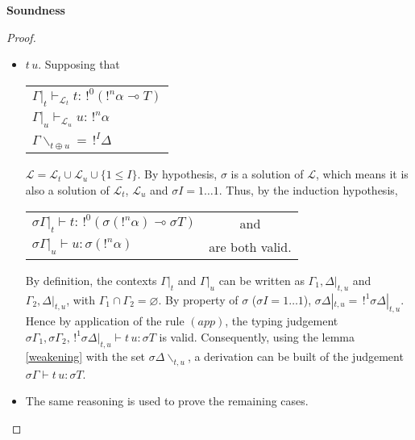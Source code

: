 \begin{prop}{\bf Soundness}
\begin{proof}
\begin{itemize}
		\item $t \, u$. Supposing that
			\begin{center}
			\begin{tabular}{l}
				$\Gamma |_t \vdash_{\mathcal{L}_t} t : \,!^0(!^n\alpha \multimap T)$ \\
				$\Gamma |_u \vdash_{\mathcal{L}_u} u : \,!^n\alpha$ \\
				$\Gamma \backslash_{t \oplus u} = \,!^I \Delta$
			\end{tabular}
			\end{center}
			$\mathcal{L} = \mathcal{L}_t \cup \mathcal{L}_u \cup \{ 1 \le I \}$. By hypothesis, $\sigma$ is a solution of $\mathcal{L}$,
			which means it is also a solution of $\mathcal{L}_t$, $\mathcal{L}_u$ and $\sigma I = 1 \dots 1$.
			Thus, by the induction hypothesis,
				\begin{center}
				\begin{tabular}{lc}
					$\sigma \Gamma|_t \vdash t : \,!^0(\sigma (!^n\alpha) \multimap \sigma T)$ & and \\
			  	$\sigma \Gamma|_u \vdash u : \sigma (!^n\alpha)$ & are both valid.
			  \end{tabular}
			  \end{center}
			By definition, the contexts $\Gamma|_t$ and $\Gamma|_u$ can be written as $\Gamma_1, \Delta|_{t, u}$ and $\Gamma_2, \Delta |_{t, u}$,
			with $\Gamma_1 \cap \Gamma_2 = \varnothing$. By property of $\sigma$ ($\sigma I = 1 \dots 1$),
			$\sigma \Delta|_{t, u} = \,!^1 \sigma \Delta|_{t, u}$. Hence by application of the rule $(app)$,
			the typing judgement $\sigma\Gamma_1, \sigma\Gamma_2, \,!^1\sigma\Delta|_{t, u} \vdash t \, u : \sigma T$ is valid.
			Consequently, using the lemma \ref{weakening} with the set $\sigma\Delta \backslash_{t, u}$, a derivation can be built of the judgement
			$\sigma\Gamma \vdash t \, u : \sigma T$.
			
		\item The same reasoning is used to prove the remaining cases.
		
 		\end{itemize}
	\end{proof}
\end{prop}


